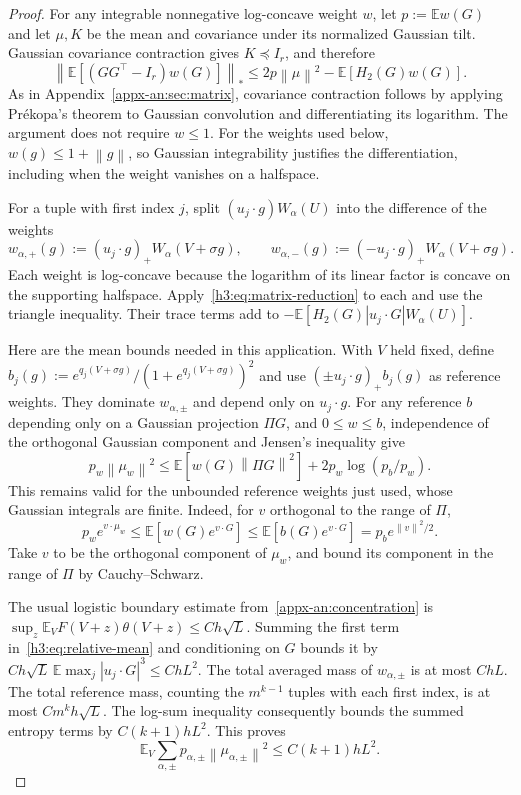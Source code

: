 \documentclass[11pt,letterpaper]{article}
\theoremstyle{remark}
\newcommand{\E}{\mathbb E}
\newcommand{\norm}[1]{\left\lVert#1\right\rVert}
\begin{document}
\begin{proof}
For any integrable nonnegative log-concave weight $w$, let
$p:=\E w(G)$ and let $\mu,K$ be the mean and covariance under its
normalized Gaussian tilt. Gaussian covariance contraction gives $K\preceq I_r$,
and therefore
\begin{equation}
 \left\|\E[(GG^\top-I_r)w(G)]\right\|_*
 \le 2p\norm\mu^2-\E[H_2(G)w(G)].
 \label{h3:eq:matrix-reduction}
\end{equation}
As in Appendix~\ref{appx-an:sec:matrix}, covariance contraction follows by applying Pr\'ekopa's
theorem to Gaussian convolution and differentiating its logarithm.
The argument does not require $w\le1$. For the weights used below,
$w(g)\le1+\norm g$, so Gaussian integrability justifies the
differentiation, including when the weight vanishes on a halfspace.

For a tuple with first index $j$, split
$(u_j\cdot g)W_\alpha(U)$ into the difference of the weights
\[
 w_{\alpha,+}(g):=(u_j\cdot g)_+W_\alpha(V+\sigma g),\qquad
 w_{\alpha,-}(g):=(-u_j\cdot g)_+W_\alpha(V+\sigma g).
\]
Each weight is log-concave because the logarithm of its linear factor
is concave on the supporting halfspace. Apply~\eqref{h3:eq:matrix-reduction}
to each and use the triangle inequality. Their trace terms add to
$-\E[H_2(G)|u_j\cdot G|W_\alpha(U)]$.

Here are the mean bounds needed in this application. With $V$ held fixed, define
$b_j(g):=e^{q_j(V+\sigma g)}/(1+e^{q_j(V+\sigma g)})^2$ and use
$(\pm u_j\cdot g)_+b_j(g)$ as reference weights. They dominate
$w_{\alpha,\pm}$ and depend only on $u_j\cdot g$.
For any reference $b$ depending only on a Gaussian projection $\Pi G$,
and $0\le w\le b$, independence of the orthogonal Gaussian component
and Jensen's inequality give
\begin{equation}
 p_w\norm{\mu_w}^2
 \le\E[w(G)\norm{\Pi G}^2]+2p_w\log(p_b/p_w).
 \label{h3:eq:relative-mean}
\end{equation}
This remains valid for the unbounded reference weights just used,
whose Gaussian integrals are finite.
Indeed, for $v$ orthogonal to the range of $\Pi$,
\[
 p_we^{v\cdot\mu_w}\le\E[w(G)e^{v\cdot G}]
 \le\E[b(G)e^{v\cdot G}]=p_be^{\norm v^2/2}.
\]
Take $v$ to be the orthogonal component of $\mu_w$, and bound its
component in the range of $\Pi$ by Cauchy--Schwarz.

The usual logistic boundary estimate from~\eqref{appx-an:concentration}
is $\sup_z\E_V F(V+z)\theta(V+z)\le Ch\sqrt L$.
Summing the first term in~\eqref{h3:eq:relative-mean} and conditioning on
$G$ bounds it by $Ch\sqrt L\,\E\max_j|u_j\cdot G|^3\le ChL^2$.
The total averaged mass of $w_{\alpha,\pm}$ is at most $ChL$.
The total reference mass, counting the $m^{k-1}$ tuples with each
first index, is at most $Cm^kh\sqrt L$.
The log-sum inequality consequently bounds the summed entropy terms
by $C(k+1)hL^2$. This proves
\begin{equation}
 \E_V\sum_{\alpha,\pm}p_{\alpha,\pm}
                   \norm{\mu_{\alpha,\pm}}^2\le C(k+1)hL^2.
 \label{h3:eq:cubic-means}
\end{equation}


\end{proof}
\end{document}
